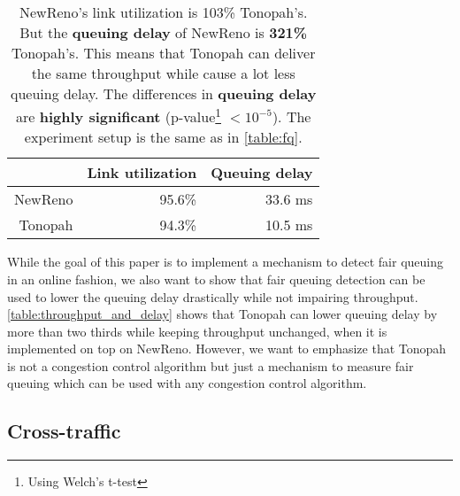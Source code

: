 \documentclass[conference]{IEEEtran}
\begin{document}
\begin{table}
\begin{minipage}{\columnwidth}
\centering
\begin{tabular}{| r | r | r |}
\hline
& Link utilization & Queuing delay \\ \hline
NewReno & 95.6\% & 33.6 ms \\ \hline
Tonopah & 94.3\% & 10.5 ms \\ \hline
\end{tabular}
\caption{NewReno's link utilization is 103\% Tonopah's. 
But the \textbf{queuing delay} of NewReno is \textbf{321\%} Tonopah's. 
This means that Tonopah can deliver the same throughput while cause a lot less queuing delay. 
The differences in \textbf{queuing delay} are \textbf{highly significant} (p-value\protect\footnote{Using Welch's t-test} $< 10^{-5}$). 
The experiment setup is the same as in \autoref{table:fq}. }
\label{table:throughput_and_delay}
\end{minipage}
\end{table}    

While the goal of this paper is to implement a mechanism to detect fair queuing in an online fashion, 
we also want to show that fair queuing detection can be used to lower the queuing delay drastically while not impairing throughput. 
\autoref{table:throughput_and_delay} shows that Tonopah can lower queuing delay by more than two thirds while keeping throughput unchanged, when it is implemented on top on NewReno. 
However, we want to emphasize that Tonopah is not a congestion control algorithm but just a mechanism to measure fair queuing which can be used with any congestion control algorithm. 

\subsection{Cross-traffic}
\end{document}
